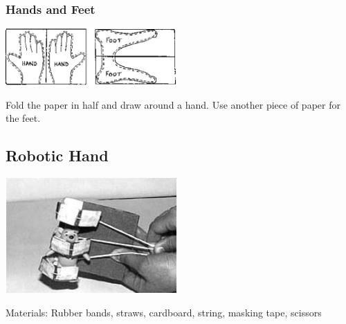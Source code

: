 \begin{multicols}{2}
\subsubsection{Hands and Feet}

\begin{center}
\includegraphics[width=0.49\textwidth]{./img/source/skeleton-hands-feet.png}
\end{center}
Fold the paper in half and draw around a hand. Use
another piece of paper for the feet.

\subsection{Robotic Hand} 

\begin{center}
\includegraphics[width=0.49\textwidth]{./img/robotic-hand-use.jpg}
\end{center}

\begin{description*}
\item[Materials:]{Rubber bands, straws, cardboard, string, masking tape, scissors}
\end{description*}


\end{multicols}
